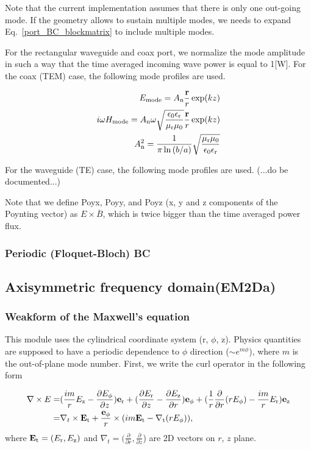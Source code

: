 \documentclass[11pt,a4paper,draft]{report}
\begin{document}
Note that the current implementation assumes that there is only one out-going mode. If the geometry allows to sustain multiple modes, we needs to expand Eq.~\ref{port_BC_blockmatrix} to include multiple modes. 

For the rectangular waveguide and coax port, we normalize the mode amplitude in such a way that the time averaged  incoming wave power is equal to 1[W]. For the coax (TEM) case, the following mode profiles are used.

 \begin{align}
E_{\rm mode} = A_{\rm n} \frac{\mathbf{r}}{r} \exp(kz)
\\
i \omega H_{\rm mode} = A_{\rm n} \omega \sqrt{\frac{\epsilon_{\rm 0}\epsilon_{\rm r}}{\mu_{\rm r}\mu_{\rm 0}}} \frac{\mathbf{r}}{r} \exp(kz)
\\
 A_{\rm n}^2 = \frac{1}{\pi \ln{(b/a)}} \sqrt{\frac{\mu_{\rm r}\mu_{\rm 0}}{\epsilon_{\rm 0}\epsilon_{\rm r}}}
\end{align}

For the waveguide (TE) case, the following mode profiles are used.
(...do be documented...)

Note that we define Poyx, Poyy, and Poyz (x, y and z components of the Poynting vector) as $E \times \overline{B}$, which is twice bigger than the time averaged power flux.


 
 \subsubsection{Periodic (Floquet-Bloch) BC}
 
\subsection{Axisymmetric frequency domain(EM2Da)}
\subsubsection{Weakform of the Maxwell's equation}
This module uses the cylindrical coordinate system (r,  $\phi$, z). Physics quantities are supposed to have a periodic dependence to 
$\phi$ direction ($\sim e^{m \phi}$), where $m$ is the out-of-plane mode number. First, we write the curl operator in the following form

 \begin{align}
 \nabla \times E = &(\frac{im}{r} E_{\rm z} - \frac{\partial E_{\phi}}{\partial z})\mathbf{e}_{\rm r} +
( \frac{\partial E_{\rm r}}{\partial z} - \frac{\partial E_{\rm z}}{\partial r})\mathbf{e}_{\rm \phi}+
 (\frac{1}{r}\frac{\partial }{\partial r}(r E_{\phi}) - \frac{im}{r} E_{\rm r} )\mathbf{e}_{\rm z} 
 \notag \\ 
 = &\nabla_{t} \times \mathbf{E}_{\rm t} + \frac{\mathbf{e}_{\rm \phi}}{r} \times (im \mathbf{E}_{\rm t} - \nabla_{\rm t} (rE_{\rm \phi}) ),
 \end{align}
 where $\mathbf{E}_{\rm t} = (E_{\rm r}, E_{\rm z})$ and  $\nabla_{t} = (\frac{\partial }{\partial r}, \frac{\partial }{\partial z}$) are 2D vectors on $r$, $z$ plane.
 
\end{document}
